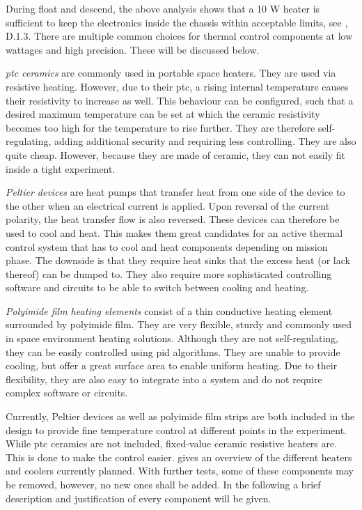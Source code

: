 During float and descend, the above analysis shows that a 10 W heater is sufficient to keep the electronics inside the chassis within acceptable limits, see , D.1.3. There are multiple common choices for thermal control components at low wattages and high precision. These will be discussed below.

\emph{\gls{ptc} ceramics} are commonly used in portable space heaters. They are used via resistive heating. However, due to their \gls{ptc}, a rising internal temperature causes their resistivity to increase as well. This behaviour can be configured, such that a desired maximum temperature can be set at which the ceramic resistivity becomes too high for the temperature to rise further. They are therefore self-regulating, adding additional security and requiring less controlling. They are also quite cheap. However, because they are made of ceramic, they can not easily fit inside a tight experiment. 

\emph{Peltier devices} are heat pumps that transfer heat from one side of the device to the other when an electrical current is applied. Upon reversal of the current polarity, the heat transfer flow is also reversed. These devices can therefore be used to cool and heat. This makes them great candidates for an active thermal control system that has to cool and heat components depending on mission phase. The downside is that they require heat sinks that the excess heat (or lack thereof) can be dumped to. They also require more sophisticated controlling software and circuits to be able to switch between cooling and heating.

\emph{Polyimide film heating elements} consist of a thin conductive heating element surrounded by polyimide film. They are very flexible, sturdy and commonly used in space environment heating solutions. Although they are not self-regulating, they can be easily controlled using \gls{pid} algorithms. They are unable to provide cooling, but offer a great surface area to enable uniform heating. Due to their flexibility, they are also easy to integrate into a system and do not require complex software or circuits.\par  


Currently, Peltier devices as well as polyimide film strips are both included in the design to provide fine temperature control at different points in the experiment.
While \gls{ptc} ceramics are not included, fixed-value ceramic resistive heaters are.
This is done to make the control easier.
 gives an overview of the different heaters and coolers currently planned.
With further tests, some of these components may be removed, however, no new ones shall be added.
In the following a brief description and justification of every component will be given.


